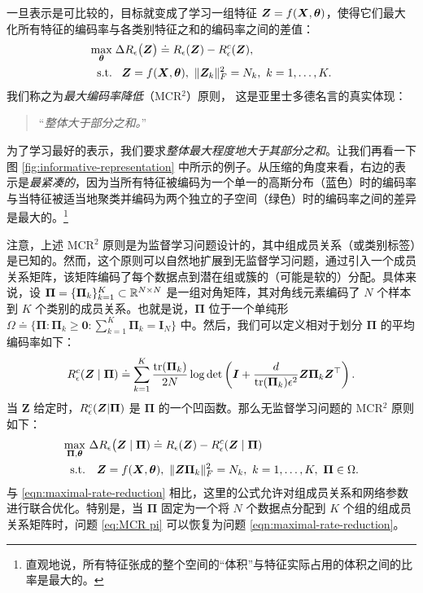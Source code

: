 \documentclass[../../book-main_zh.tex]{subfiles}
\begin{document}
一旦表示是可比较的，目标就变成了学习一组特征 $\bm{Z}  = f(\bm{X}, \bm \theta)$，使得它们最大化所有特征的编码率与各类别特征之和的编码率之间的差值：
\begin{equation}
	\begin{aligned}
		\max_{\bm \theta } & \;  \Delta R_{\epsilon}\big(\Z \big) \doteq R_{\epsilon}(\Z) - R_{\epsilon}^c(\Z ), \\
		\mbox{s.t.} & \ \ \, \Z = f(\bm X, \bm \theta),\  \|\Z_k\|_F^2                                          = N_k,\ k=1,\dots,K. 
	\end{aligned}
	\label{eqn:maximal-rate-reduction}
\end{equation}
我们称之为{\em 最大编码率降低}（MCR$^2$）原则，
这是亚里士多德名言的真实体现：
\begin{quote}
	\centering
	“{\em 整体大于部分之和。}”
\end{quote}
为了学习最好的表示，我们要求{\em 整体最大程度地大于其部分之和}。让我们再看一下图 \ref{fig:informative-representation} 中所示的例子。从压缩的角度来看，右边的表示是{\em 最紧凑的}，因为当所有特征被编码为一个单一的高斯分布（蓝色）时的编码率与当特征被适当地聚类并编码为两个独立的子空间（绿色）时的编码率之间的差异是最大的。\footnote{直观地说，所有特征张成的整个空间的“体积”与特征实际占用的体积之间的比率是最大的。}

 
    注意，上述 MCR$^2$ 原则是为监督学习问题设计的，其中组成员关系（或类别标签）是已知的。然而，这个原则可以自然地扩展到无监督学习问题，通过引入一个成员关系矩阵，该矩阵编码了每个数据点到潜在组或簇的（可能是软的）分配。具体来说，设 $\bm \Pi = \{\bm \Pi_k\}_{k=1}^K \subset \mathbb{R}^{N\times N}$ 是一组对角矩阵，其对角线元素编码了 $N$ 个样本到 $K$ 个类别的成员关系。也就是说，$\bm \Pi$ 位于一个单纯形 $\Omega \doteq \{\bm \Pi: \bm \Pi_k \ge \bm 0: \sum_{k=1}^K \bm \Pi_k = \bm I_N\}$ 中。然后，我们可以定义相对于划分 $\bm \Pi$ 的平均编码率如下：
    \begin{align}\label{eq:MCRc}
        R_{\epsilon}^c(\bm{Z} \mid \bm \Pi) \doteq \sum_{k=1}^K \frac{\mathrm{tr}(\bm \Pi_k)}{2N}\log\det\left(\bm I + \frac{d}{\mathrm{tr}(\bm \Pi_k)\epsilon^2}\bm Z\bm \Pi_k \bm Z^\top \right).
    \end{align}
    当 $\bm Z$ 给定时，$R_{\epsilon}^c(\bm{Z} \vert \bm \Pi)$ 是 $\bm \Pi$ 的一个凹函数。那么无监督学习问题的 MCR$^2$ 原则如下：
    \begin{align}\label{eq:MCR pi}
        \max_{\bm \Pi, \bm \theta} & \  \Delta R_{\epsilon}\big(\bm{Z}  \mid \bm \Pi) \doteq R_{\epsilon}(\bm Z) - R_{\epsilon}^c(\bm{Z} \mid \bm \Pi) \notag \\ 
       \mathrm{s.t.}  & \ \ \ \bm Z = f(\bm X, \bm \theta),\ \|\bm Z \bm \Pi_k\|_F^2 = N_k,\ k = 1,\dots,K,\ \bm\Pi \in \Omega. 
    \end{align}
    与 \eqref{eqn:maximal-rate-reduction} 相比，这里的公式允许对组成员关系和网络参数进行联合优化。特别是，当 $\bm \Pi$ 固定为一个将 $N$ 个数据点分配到 $K$ 个组的组成员关系矩阵时，问题 \eqref{eq:MCR pi} 可以恢复为问题 \eqref{eqn:maximal-rate-reduction}。
 
\end{document}
